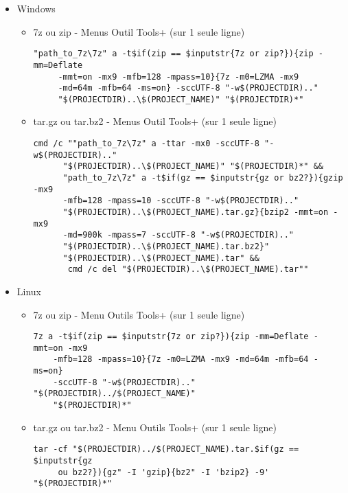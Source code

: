 
\begin{itemize}
\item Windows
\begin{itemize}
\item 7z ou zip - Menus Outil Tools+ (sur 1 seule ligne)
\begin{verbatim}
"path_to_7z\7z" a -t$if(zip == $inputstr{7z or zip?}){zip -mm=Deflate
     -mmt=on -mx9 -mfb=128 -mpass=10}{7z -m0=LZMA -mx9 
     -md=64m -mfb=64 -ms=on} -sccUTF-8 "-w$(PROJECTDIR).."
     "$(PROJECTDIR)..\$(PROJECT_NAME)" "$(PROJECTDIR)*"
\end{verbatim}

\item tar.gz ou tar.bz2 - Menus Outil Tools+  (sur 1 seule ligne)
\begin{verbatim}
cmd /c ""path_to_7z\7z" a -ttar -mx0 -sccUTF-8 "-w$(PROJECTDIR).."
      "$(PROJECTDIR)..\$(PROJECT_NAME)" "$(PROJECTDIR)*" && 
      "path_to_7z\7z" a -t$if(gz == $inputstr{gz or bz2?}){gzip -mx9 
      -mfb=128 -mpass=10 -sccUTF-8 "-w$(PROJECTDIR).." 
      "$(PROJECTDIR)..\$(PROJECT_NAME).tar.gz}{bzip2 -mmt=on -mx9 
      -md=900k -mpass=7 -sccUTF-8 "-w$(PROJECTDIR).." 
      "$(PROJECTDIR)..\$(PROJECT_NAME).tar.bz2}"
      "$(PROJECTDIR)..\$(PROJECT_NAME).tar" && 
       cmd /c del "$(PROJECTDIR)..\$(PROJECT_NAME).tar""
\end{verbatim}


\end{itemize}

\item Linux
\begin{itemize}
\item 7z ou zip - Menu Outils Tools+ (sur 1 seule ligne)
\begin{verbatim}
7z a -t$if(zip == $inputstr{7z or zip?}){zip -mm=Deflate -mmt=on -mx9
    -mfb=128 -mpass=10}{7z -m0=LZMA -mx9 -md=64m -mfb=64 -ms=on}
    -sccUTF-8 "-w$(PROJECTDIR).." "$(PROJECTDIR)../$(PROJECT_NAME)"
    "$(PROJECTDIR)*"
\end{verbatim}
\item tar.gz ou tar.bz2 - Menu Outils Tools+ (sur 1 seule ligne)
\begin{verbatim}
tar -cf "$(PROJECTDIR)../$(PROJECT_NAME).tar.$if(gz == $inputstr{gz 
     ou bz2?}){gz" -I 'gzip}{bz2" -I 'bzip2} -9' "$(PROJECTDIR)*"
\end{verbatim}
\end{itemize}
\end{itemize}
